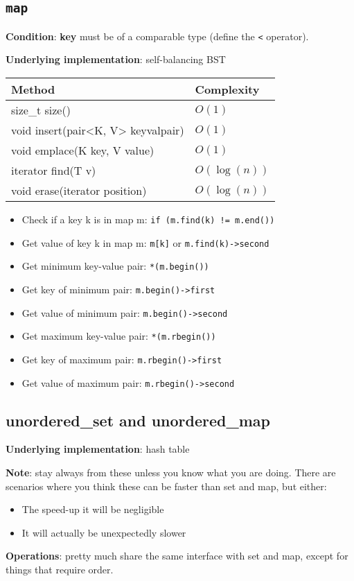   \subsection{\lstinline{map}}
  \par \textbf{Condition}: \textbf{key} must be of a comparable type (define the \lstinline{<} operator).
  \par \textbf{Underlying implementation}: self-balancing BST
  \begin{table}[H]
    \begin{tabular}{|l|l|}
    \hline
    \textbf{Method}      & \textbf{Complexity}      \\ \hline
    size\_t size()                   & $O(1)$          \\ \hline
    void insert(pair<K, V> keyvalpair) & $O(1)$          \\ \hline
    void emplace(K key, V value)     & $O(1)$          \\ \hline
    iterator find(T v)               & $O(\log(n))$    \\ \hline
    void erase(iterator position)    & $O(\log(n))$    \\ \hline
    \end{tabular}
  \end{table}
  \begin{itemize}
    \item Check if a key k is in map m: \lstinline{if (m.find(k) != m.end())}
    \item Get value of key k in map m: \lstinline{m[k]} or \lstinline{m.find(k)->second}
    \item Get minimum key-value pair: \lstinline{*(m.begin())}
    \item Get key of minimum pair: \lstinline{m.begin()->first}
    \item Get value of minimum pair: \lstinline{m.begin()->second}
    \item Get maximum key-value pair: \lstinline{*(m.rbegin())}
    \item Get key of maximum pair: \lstinline{m.rbegin()->first}
    \item Get value of maximum pair: \lstinline{m.rbegin()->second}
  \end{itemize}

  \subsection{unordered\_set and unordered\_map}
  \par \textbf{Underlying implementation}: hash table
  \par \textbf{Note}: stay always from these unless you know what you are doing. There are scenarios where you think these can be faster than set and map, but either:
  \begin{itemize}
    \item The speed-up it will be negligible
    \item It will actually be unexpectedly slower
  \end{itemize}
  \par \textbf{Operations}: pretty much share the same interface with set and map, except for things that require order.

